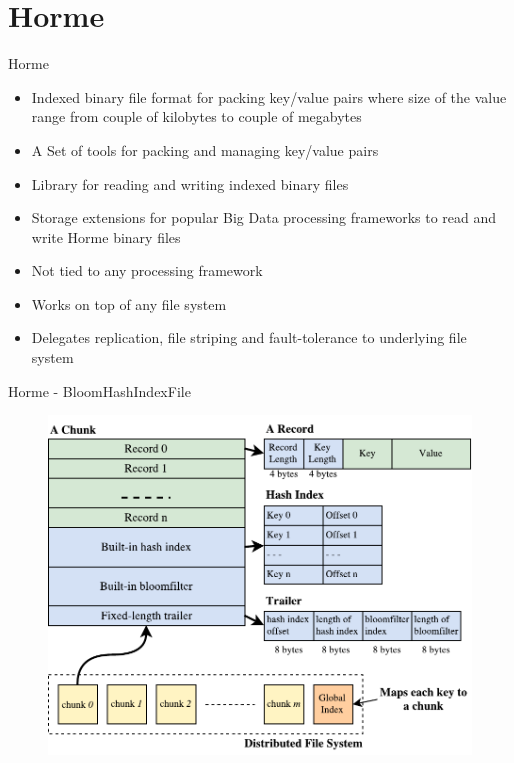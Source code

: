 \documentclass[newPxFont]{beamer}
\begin{document}
\section{Horme}

\begin{frame}[c]{Horme}
\begin{itemize}
  \item Indexed binary file format for packing key/value pairs where size of the value range from couple of kilobytes to couple of megabytes
  \item A Set of tools for packing and managing key/value pairs  
  \item Library for reading and writing indexed binary files 
  \item Storage extensions for popular Big Data processing frameworks to read and write Horme binary files
  \item Not tied to any processing framework
  \item Works on top of any file system
  \item Delegates replication, file striping and fault-tolerance to underlying file system
\end{itemize}
\end{frame}

\begin{frame}[c]{Horme - BloomHashIndexFile}
\begin{figure}[t]
  \includegraphics[scale=0.6]{horme-2}
  \centering
\end{figure}  
\end{frame}
\end{document}
